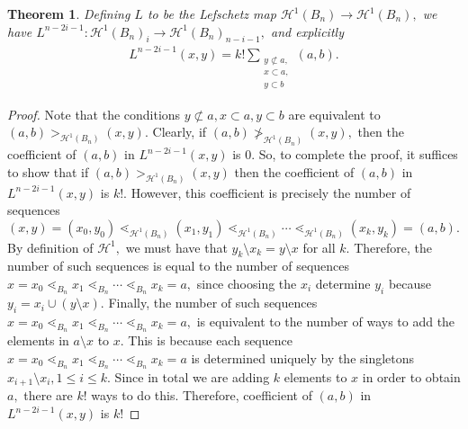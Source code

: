 \documentclass[10 pt]{amsart}
\theoremstyle{plain}
\newtheorem{thm}{Theorem}[section]
\theoremstyle{definition}
\theoremstyle{remark}
\numberwithin{equation}{section}
\newcommand\fbn{\mathcal H}
\begin{document}
\begin{thm}
\label{explicit_gbn_lefchetz}
Defining $L$ to be the Lefschetz map $\mathcal H^1(B_n) \rightarrow \mathcal H^1(B_n),$ we have $L^{n-2i-1}:\fbn^1(B_n)_i \rightarrow \fbn^1(B_n)_{n-i-1},$ and explicitly 
\begin{align*}
	L^{n-2i-1}(x, y)= k!\sum_{\substack{{y \not \subset a,}\\{x\subset a,}\\{y \subset b}}}^{}(a, b).
\end{align*}
\end{thm}
\begin{proof}
Note that the conditions $y \not \subset a, x\subset a, y\subset b$ are equivalent to $(a, b) >_{\mathcal H^1(B_n)} (x, y).$ Clearly, if $(a, b) \not >_{\mathcal H^1(B_n)} (x, y),$ then the coefficient of $(a, b)$ in $	L^{n-2i-1}(x, y)$ is 0. So, to complete the proof, it suffices to show that if  $(a, b) >_{\mathcal H^1(B_n)} (x, y)$ then the coefficient of $(a, b)$ in $	L^{n-2i-1}(x, y)$ is $k!$. However, this coefficient is precisely the number of sequences $(x, y) = (x_0, y_0) \lessdot_{\mathcal H^1(B_n)} (x_1, y_1) \lessdot_{\mathcal H^1(B_n)}  \cdots \lessdot_{\mathcal H^1(B_n)}  (x_k, y_k) = (a, b).$ By definition of $\mathcal H^1,$ we must have that $y_k \setminus x_k = y\setminus x$ for all $k.$ Therefore, the number of such sequences is equal to the number of sequences $x=x_0 \lessdot_{B_n} x_1 \lessdot_{B_n} \cdots \lessdot_{B_n} x_k = a,$ since choosing the $x_i$ determine $y_i$ because $y_i = x_i \cup (y \setminus x).$ Finally, the number of such sequences  $x=x_0 \lessdot_{B_n} x_1 \lessdot_{B_n} \cdots \lessdot_{B_n} x_k = a,$ is equivalent to the number of ways to add the elements in $a \setminus x$ to $x$. This is because each sequence $x=x_0 \lessdot_{B_n} x_1 \lessdot_{B_n} \cdots \lessdot_{B_n} x_k = a$ is determined uniquely by the singletons $x_{i+1} \setminus x_i, 1 \leq i \leq k.$ Since in total we are adding $k$ elements to $x$ in order to obtain $a,$ there are $k!$ ways to do this. Therefore, coefficient of $(a, b)$ in $	L^{n-2i-1}(x, y)$ is $k!$
\end{proof}
\end{document}
